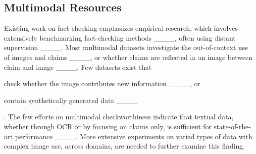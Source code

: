 \subsection{Multimodal Resources}
Existing work on fact-checking emphasizes empirical research, which involves extensively benchmarking fact-checking methods ____, often using distant supervision ____. Most multimodal datasets investigate the out-of-context use of images and claims ____, or whether claims are reflected in an image between claim and image ____. Few datasets exist that
\begin{enumerate*}[label=(\arabic*)]
    \item check whether the image contributes new information ____, or
    \item contain synthetically generated data ____
\end{enumerate*}. The few efforts on multimodal checkworthiness indicate that textual data, whether through OCR or by focusing on claims only, is sufficient for state-of-the-art performance ____. More extensive experiments on varied types of data with complex image use, across domains, are needed to further examine this finding.

